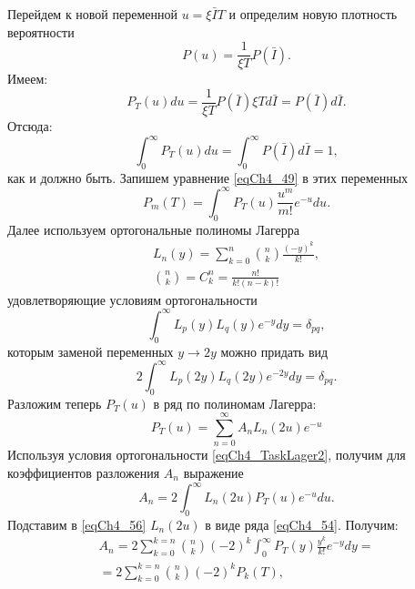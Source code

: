Перейдем к новой переменной $u = \xi \bar{I} T$ и определим новую
плотность вероятности 
\[
P\left(u\right) = \frac{1}{\xi T} P\left(\bar{I}\right).
\]
Имеем: 
\[
P_T\left(u\right) du = \frac{1}{\xi T} P\left(\bar{I}\right) \xi T d
\bar{I} = P\left(\bar{I}\right) d \bar{I}.
\]
Отсюда: 
\[
\int_0^{\infty}P_T\left(u\right) du = 
\int_0^{\infty}P\left(\bar{I}\right) d\bar{I} = 1, 
\]
как и должно быть. Запишем уравнение \eqref{eqCh4_49} в этих  
переменных 
\begin{equation}
P_m\left(T\right) = 
\int_0^{\infty}
P_T\left(u\right)
\frac{u^m}{m!} e^{-u} 
d u.
\label{eqCh4_53}
\end{equation}
Далее используем ортогональные полиномы Лагерра
\begin{eqnarray}
L_n\left(y\right) = \sum_{k = 0}^{n}{n\choose k}
\frac{\left(-y\right)^k}{k!},
\nonumber \\
{n\choose k} = C_k^n = \frac{n!}{k!\left(n - k\right)!}
\label{eqCh4_54}
\end{eqnarray}
удовлетворяющие условиям ортогональности 
\begin{equation}
\int_0^{\infty}L_p\left(y\right)L_q\left(y\right)e^{-y} dy =
\delta_{pq},
\label{eqCh4_TaskLager1}
\end{equation}
которым заменой переменных $y \rightarrow 2y$ можно придать вид
\begin{equation}
2 \int_0^{\infty}L_p\left(2 y\right)L_q\left(2 y\right)e^{-2 y} dy =
\delta_{pq}. 
\label{eqCh4_TaskLager2}
\end{equation}
Разложим теперь $P_T\left(u\right)$ в ряд по полиномам Лагерра:
\begin{equation}
P_T\left(u\right) = 
\sum_{n = 0}^{\infty}
A_n L_n\left(2u \right)
e^{-u} 
\label{eqCh4_55}
\end{equation}
Используя условия ортогональности \eqref{eqCh4_TaskLager2}, получим для
коэффициентов разложения $A_n$ выражение  
\begin{equation}
A_n = 2 \int_0^{\infty}
L_n\left(2 u\right)P_T\left(u\right)e^{-u}du.
\label{eqCh4_56}
\end{equation}
Подставим в \eqref{eqCh4_56} $L_n\left(2 u\right)$ в виде ряда
\eqref{eqCh4_54}. Получим: 
\begin{eqnarray}
A_n = 2 \sum_{k = 0}^{k = n}
{n\choose k}\left(- 2\right)^k\int_0^{\infty}
P_T\left(y\right)\frac{y^k}{k!}e^{-y} dy = 
\nonumber \\
= 2 \sum_{k = 0}^{k = n}
{n\choose k}
\left(- 2\right)^k
P_k\left(T\right),
\label{eqCh4_57}
\end{eqnarray}
